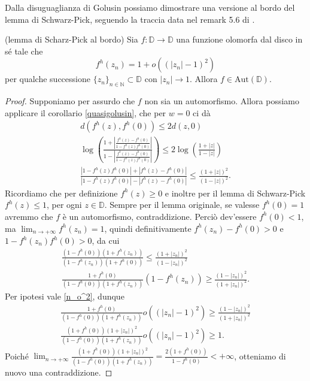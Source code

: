 Dalla disuguaglianza di Golusin possiamo dimostrare una versione al bordo del lemma di Schwarz-Pick, seguendo la traccia data nel remark 5.6 di \cite{BKR}.

\begin{thm} \label{boundary_schwarz_pick}
  (lemma di Scharz-Pick al bordo) Sia $f:\mathbb{D} \longrightarrow \mathbb{D}$ una funzione olomorfa dal disco in sé tale che
  \begin{equation} \label{n_o^2}
    f^h(z_n)=1+o((|z_n|-1)^2)
  \end{equation}
  per qualche successione $\{z_n\}_{n \in \mathbb{N}} \subset \mathbb{D}$ con $|z_n| \longrightarrow 1$. Allora $f \in \text{Aut}(\mathbb{D})$.
\end{thm}

\begin{proof}
  Supponiamo per assurdo che $f$ non sia un automorfismo. Allora possiamo applicare il corollario \ref{quasigolusin}, che per $w=0$ ci dà
  \begin{align*}
    d(f^h(z), f^h(0)) \le 2d(z,0) \\
    \log{\left(\frac{1+\left|\frac{f^h(z)-f^h(0)}{1-f^h(z)f^h(0)}\right|}{1-\left|\frac{f^h(z)-f^h(0)}{1-f^h(z)f^h(0)}\right|}\right)} \le 2\log{\left(\frac{1+|z|}{1-|z|}\right)} \\
    \frac{|1-f^h(z)f^h(0)|+|f^h(z)-f^h(0)|}{|1-f^h(z)f^h(0)|-|f^h(z)-f^h(0)|} \le \frac{(1+|z|)^2}{(1-|z|)^2}.
  \end{align*}
  Ricordiamo che per definizione $f^h(z) \ge 0$ e inoltre per il lemma di Schwarz-Pick $f^h(z) \le 1$, per ogni $z \in \mathbb{D}$. Sempre per il lemma originale, se valesse $f^h(0)=1$ avremmo che $f$ è un automorfismo, contraddizione. Perciò dev'essere $f^h(0)<1$, ma $\displaystyle \lim_{n \longrightarrow +\infty} f^h(z_n)=1$, quindi definitivamente $f^h(z_n)-f^h(0)>0$ e $1-f^h(z_n)f^h(0)>0$, da cui
  \begin{align*}
    \frac{(1-f^h(0))(1+f^h(z_n))}{(1-f^h(z_n))(1+f^h(0))} \le \frac{(1+|z_n|)^2}{(1-|z_n|)^2} \\
    \frac{1+f^h(0)}{(1-f^h(0))(1+f^h(z_n))}(1-f^h(z_n)) \ge \frac{(1-|z_n|)^2}{(1+|z_n|)^2}.
  \end{align*}
  Per ipotesi vale \eqref{n_o^2}, dunque
  \begin{align*}
    \frac{1+f^h(0)}{(1-f^h(0))(1+f^h(z_n))}o((|z_n|-1)^2) \ge \frac{(1-|z_n|)^2}{(1+|z_n|)^2} \\
    \frac{(1+f^h(0))(1+|z_n|)^2}{(1-f^h(0))(1+f^h(z_n))}o((|z_n|-1)^2) \ge 1.
  \end{align*}
  Poiché $\displaystyle \lim_{n \longrightarrow +\infty} \frac{(1+f^h(0))(1+|z_n|)^2}{(1-f^h(0))(1+f^h(z_n))}=\frac{2(1+f^h(0))}{1-f^h(0)} < +\infty$, otteniamo di nuovo una contraddizione.
\end{proof}
